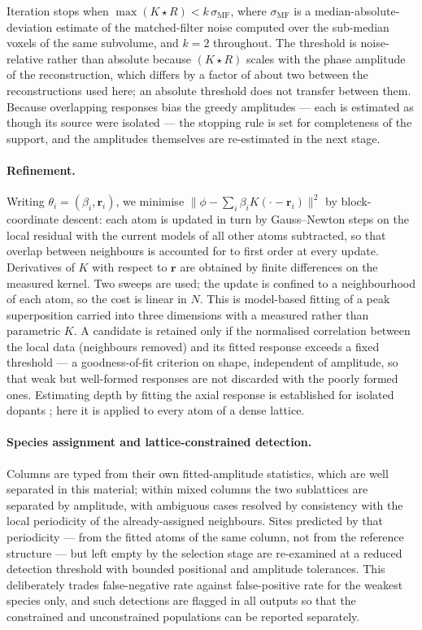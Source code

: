 Iteration stops when $\max(K\star R) < k\,\sigma_{\mathrm{MF}}$, where
$\sigma_{\mathrm{MF}}$ is a median-absolute-deviation estimate of the matched-filter noise
computed over the sub-median voxels of the same subvolume, and $k=2$ throughout. The
threshold is noise-relative rather than absolute because $(K\star R)$ scales with the phase
amplitude of the reconstruction, which differs by a factor of about two between the
reconstructions used here; an absolute threshold does not transfer between them. Because
overlapping responses bias the greedy amplitudes --- each is estimated as though its source
were isolated --- the stopping rule is set for completeness of the support, and the
amplitudes themselves are re-estimated in the next stage.

\paragraph{Refinement.}
Writing $\theta_i = (\beta_i,\mathbf{r}_i)$, we minimise
$\lVert \phi - \sum_i \beta_i K(\cdot-\mathbf{r}_i)\rVert^2$ by block-coordinate descent:
each atom is updated in turn by Gauss--Newton steps on the local residual with the current
models of all other atoms subtracted, so that overlap between neighbours is accounted for
to first order at every update. Derivatives of $K$ with respect to $\mathbf{r}$ are obtained
by finite differences on the measured kernel. Two sweeps are used; the update is confined to
a neighbourhood of each atom, so the cost is linear in $N$. This is model-based fitting of a
peak superposition \citep{DeBacker2016} carried into three dimensions with a measured rather
than parametric $K$. A candidate is retained only if the normalised correlation between the
local data (neighbours removed) and its fitted response exceeds a fixed threshold --- a
goodness-of-fit criterion on shape, independent of amplitude, so that weak but well-formed
responses are not discarded with the poorly formed ones. Estimating depth by fitting the
axial response is established for isolated dopants
\citep{Chen2021,Ishikawa2014}; here it is applied to every atom of a dense lattice.

\paragraph{Species assignment and lattice-constrained detection.}
Columns are typed from their own fitted-amplitude statistics, which are well separated in
this material; within mixed columns the two sublattices are separated by amplitude, with
ambiguous cases resolved by consistency with the local periodicity of the already-assigned
neighbours. Sites predicted by that periodicity --- from the fitted atoms of the same
column, not from the reference structure --- but left empty by the selection stage are
re-examined at a reduced detection threshold with bounded positional and amplitude
tolerances. This deliberately trades false-negative rate against false-positive rate for
the weakest species only, and such detections are flagged in all outputs so that the
constrained and unconstrained populations can be reported separately.

